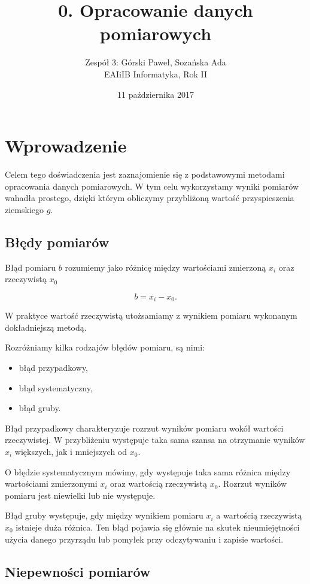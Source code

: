 \documentclass[12pt,a4paper]{article}
\title{0. Opracowanie danych pomiarowych}
\date{11 października 2017}
\author{
	Zespół 3: Górski Paweł, Sozańska Ada\\
	EAIiIB Informatyka, Rok II
}
\numberwithin{equation}{section}
\begin{document}
\maketitle
\section{Wprowadzenie}
Celem tego doświadczenia jest zaznajomienie się z podstawowymi metodami opracowania danych pomiarowych. W tym celu wykorzystamy wyniki pomiarów wahadła prostego, dzięki którym obliczymy przybliżoną wartość przyspieszenia ziemskiego $g$.

\subsection{Błędy pomiarów}

Błąd pomiaru $b$ rozumiemy jako różnicę między wartościami zmierzoną $x_i$ oraz rzeczywistą $x_0$

\begin{equation}
	b = x_i - x_0.
\end{equation}

W praktyce wartość rzeczywistą utożsamiamy z wynikiem pomiaru wykonanym dokładniejszą metodą.

\pagebreak
Rozróżniamy kilka rodzajów błędów pomiaru, są nimi:
\begin{itemize}
	\item błąd przypadkowy,
	\item błąd systematyczny,
	\item błąd gruby.
\end{itemize}

Błąd przypadkowy charakteryzuje rozrzut wyników pomiaru wokół wartości rzeczywistej. W przybliżeniu występuje taka sama szansa na otrzymanie wyników $x_i$ większych, jak i mniejszych od $x_0$.

O błędzie systematycznym mówimy, gdy występuje taka sama różnica między wartościami zmierzonymi $x_i$ oraz wartością rzeczywistą $x_0$. Rozrzut wyników pomiaru jest niewielki lub nie występuje.

Błąd gruby występuje, gdy między wynikiem pomiaru $x_i$ a wartością rzeczywistą $x_0$ istnieje duża różnica. Ten błąd pojawia się głównie na skutek nieumiejętności użycia danego przyrządu lub pomyłek przy odczytywaniu i zapisie wartości.

\subsection{Niepewności pomiarów}
\end{document}
